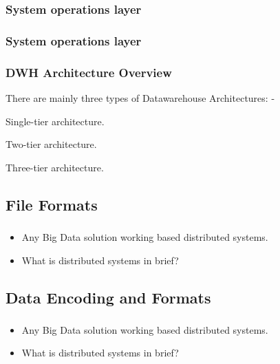 \subsubsection{System operations layer}

\begin{frame}
\frametitle{System operations layer}
\end{frame}



\begin{frame}
\frametitle{DWH Architecture Overview}
There are mainly three types of Datawarehouse Architectures: -
\begin{wideitemize}
	\item Single-tier architecture.
	\item Two-tier architecture.
	\item Three-tier architecture.
\end{wideitemize}

\end{frame}


\subsection{File Formats}

\begin{frame}
\frametitle{\subsecname}
\begin{itemize}[<+->]
	\item Any Big Data solution working based distributed systems.
	\item What is distributed systems in brief?
\end{itemize}
\end{frame}
\subsection{Data Encoding and Formats}

\begin{frame}
\frametitle{\subsecname}
\begin{itemize}[<+->]
	\item Any Big Data solution working based distributed systems.
	\item What is distributed systems in brief?
\end{itemize}
\end{frame}
